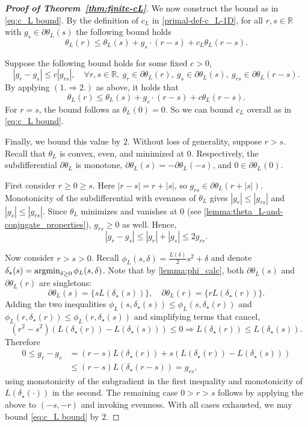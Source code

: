 \documentclass[11pt, hidelinks]{article}
\numberwithin{equation}{section}
\newcommand{\argmin}{\operatornamewithlimits{argmin}}
\theoremstyle{thmstyletwo}%
\numberwithin{equation}{section}
\newcommand{\R}{\mathbb{R}}
\begin{document}
\begin{proof}[{\bf Proof of Theorem~\ref{thm:finite-cL}}]
We now construct the bound as in \eqref{eq:c_L bound}. By the definition of $c_L$ in \eqref{primal-def-c_L-1D}, for all $r, s \in \R$ with $g_s \in \partial \theta_L(s)$ the following bound holds $$\theta_L(r) \leq \theta_L(s)+g_s\cdot(r-s)+c_L \theta_L(r-s).$$

Suppose the following bound holds for some fixed $c > 0$, $$|g_r-g_s| \leq c|g_{rs}|, \quad \forall r, s \in \R, \  g_r \in \partial \theta_L(r), \ g_s \in \partial \theta_L(s), \ g_{rs} \in \partial \theta_L(r-s). $$ By applying $(1. \Longrightarrow 2.)$ as above, it holds that $$\theta_L(r) \leq  \theta_L(s) + g_s\cdot(r-s) + c\theta_L(r-s).$$ For $r = s$, the bound follows as $\theta_L(0) = 0$. So we can bound $c_L$ overall as in \eqref{eq:c_L bound}.


Finally, we bound this value by $2$. Without loss of generality, suppose $r > s$. Recall that $\theta_L$ is convex, even, and minimized at $0$. Respectively, the subdifferential $\partial\theta_L$ is monotone,  $\partial\theta_L(s) = -\partial\theta_L(-s)$, and $0 \in \partial\theta_L(0)$.

First consider $r \geq 0 \geq s$. Here $|r-s| = r + |s|$, so $g_{rs} \in \partial\theta_L(r+|s|)$. Monotonicity of the subdifferential with evenness of $\theta_L$ gives $|g_r| \leq |g_{rs}|$ and $|g_s| \leq |g_{rs}|$. Since $\theta_L$ minimizes and vanishes at $0$ (see \cref{lemma:theta_L-and-conjugate_properties}), $g_{rs} \geq 0$ as well. Hence,
$$|g_r - g_s| \leq |g_r| + |g_s| \leq 2 g_{rs}.$$

Now consider $r > s > 0$. Recall $\phi_L(s,\delta) = \frac{L(\delta)}{2}s^2 + \delta$ and denote $\delta_\star(s) = \argmin_{\delta \geq 0} \phi_L(s,\delta)$. Note that by \cref{lemma:phi_calc}, both $\partial \theta_L(s)$ and $\partial \theta_L(r)$ are singletons:
$$\partial \theta_L(s) = \{sL(\delta_\star(s))\}, \quad \partial \theta_L(r) = \{rL(\delta_\star(r))\}.$$
Adding the two inequalities $\phi_L(s,\delta_\star(s)) \leq \phi_L(s,\delta_\star(r))$ and $\phi_L(r,\delta_\star(r)) \leq \phi_L(r,\delta_\star(s))$ and simplifying terms that cancel, 
$$(r^2-s^2)(L(\delta_\star(r))-L(\delta_\star(s))) \leq 0 \Longrightarrow L(\delta_\star(r)) \leq L(\delta_\star(s)).$$
Therefore
\begin{align*}
    0 \leq g_r - g_s &= (r-s)L(\delta_\star(r))+s(L(\delta_\star(r))-L(\delta_\star(s)))\\
    &\leq (r-s)L(\delta_\star(r-s))=g_{rs},
\end{align*}
using monotonicity of the subgradient in the first inequality and monotonicity of $L(\delta_\star(\cdot))$ in the second.
The remaining case $0 > r > s$ follows by applying the above to $(-s,-r)$ and invoking evenness. With all cases exhausted, we may bound \eqref{eq:c_L bound} by $2$.
\end{proof}
\end{document}
